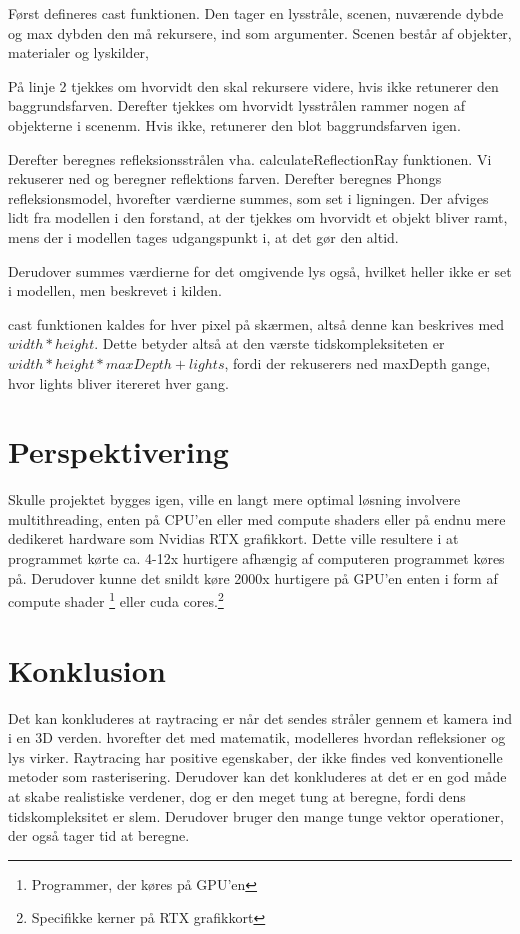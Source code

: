 \documentclass{article}
\begin{document}
\begin{flushleft}
    Først defineres cast funktionen.
    Den tager en lysstråle, scenen, nuværende dybde og max dybden den må rekursere, ind som argumenter.
    Scenen består af objekter, materialer og lyskilder,

    På linje 2 tjekkes om hvorvidt den skal rekursere videre, hvis ikke retunerer den baggrundsfarven.
    Derefter tjekkes om hvorvidt lysstrålen rammer nogen af objekterne i scenenm.
    Hvis ikke, retunerer den blot baggrundsfarven igen.

    Derefter beregnes refleksionsstrålen vha. calculateReflectionRay funktionen.
    Vi rekuserer ned og beregner reflektions farven.
    Derefter beregnes Phongs refleksionsmodel, hvorefter værdierne summes, som set i ligningen.
    Der afviges lidt fra modellen i den forstand, at der tjekkes om hvorvidt et objekt bliver ramt,
    mens der i modellen tages udgangspunkt i, at det gør den altid.

    Derudover summes værdierne for det omgivende lys også, hvilket heller ikke er set i modellen, men beskrevet i kilden.

    cast funktionen kaldes for hver pixel på skærmen, altså denne kan beskrives med \(width * height\).
    Dette betyder altså at den værste tidskompleksiteten er \(width*height*maxDepth+lights\), fordi der rekuserers ned maxDepth gange,
    hvor lights bliver itereret hver gang.

    \section{Perspektivering}

    Skulle projektet bygges igen, ville en langt mere optimal løsning involvere multithreading,
    enten på CPU'en eller med compute shaders eller på endnu mere dedikeret hardware som Nvidias RTX grafikkort.
    Dette ville resultere i at programmet kørte ca. 4-12x hurtigere afhængig af computeren programmet køres på.
    Derudover kunne det snildt køre 2000x hurtigere på GPU'en enten i form af compute shader
    \footnote{Programmer, der køres på GPU'en} eller cuda cores.\footnote{Specifikke kerner på RTX grafikkort}

    \section{Konklusion}

    Det kan konkluderes at raytracing er når det sendes stråler gennem et kamera ind i en 3D verden.
    hvorefter det med matematik, modelleres hvordan refleksioner og lys virker. Raytracing har positive egenskaber,
    der ikke findes ved konventionelle metoder som rasterisering. Derudover kan det konkluderes at det er en god måde at skabe realistiske verdener,
    dog er den meget tung at beregne, fordi dens tidskompleksitet er slem. Derudover bruger den mange tunge vektor operationer, der også tager tid at beregne.


\end{flushleft}
\end{document}
